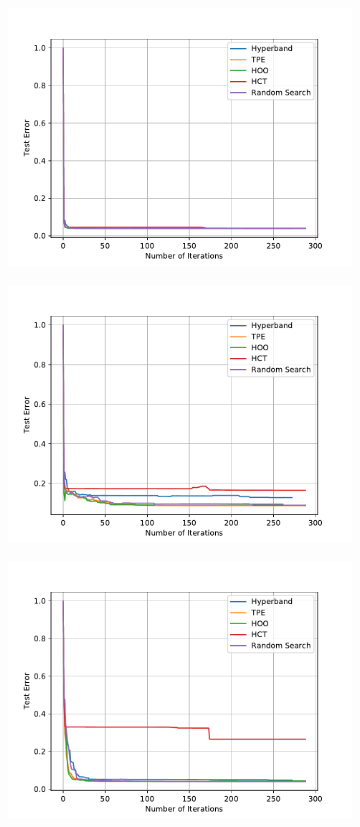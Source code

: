 \documentclass[twoside,11pt]{article}
\begin{document}
\begin{figure}
\begin{subfigure}[t]{0.3\textwidth}
    \centering\includegraphics[width=\textwidth]{img/uci/knn_0.pdf}
    \caption{\KNN}
  \end{subfigure}
  \begin{subfigure}[t]{0.3\textwidth}
    \centering\includegraphics[width=\textwidth]{img/uci/sk_mlp_0.pdf}
    \caption{\MLP}
  \end{subfigure}
  \begin{subfigure}[t]{0.3\textwidth}
    \centering\includegraphics[width=\textwidth]{img/uci/svm_0.pdf}

\end{subfigure}
\end{figure}
\end{document}
